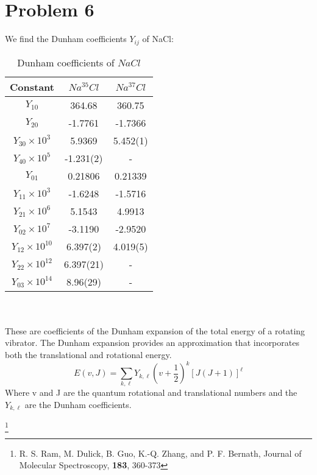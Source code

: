 \documentclass[a4paper,10pt]{article}
\numberwithin{equation}{section}
\begin{document}
\section{Problem 6}
We find the Dunham coefficients $Y_{ij}$ of NaCl\footnotemark[1]: \\
\begin{table}[h]
 \caption{Dunham coefficients of $NaCl$}
 \centering
 \begin{tabular}{ccc}
 \\
 Constant & $Na^{35}Cl$ & $Na^{37}Cl$ \\
 \hline
 $Y_{10}$ & 364.68 & 360.75 \\
 $Y_{20}$ & -1.7761 & -1.7366 \\
 $Y_{30}\times10^3$ & 5.9369 & 5.452(1) \\
 $Y_{40}\times10^5$ & -1.231(2) & - \\
 $Y_{01}$ & 0.21806 & 0.21339 \\
 $Y_{11}\times10^3$ & -1.6248 & -1.5716 \\
 $Y_{21}\times10^6$ & 5.1543 & 4.9913 \\
 $Y_{02}\times10^7$ & -3.1190 & -2.9520 \\ 
 $Y_{12}\times10^10$ & 6.397(2) & 4.019(5) \\
 $Y_{22}\times10^12$ & 6.397(21) & - \\
 $Y_{03}\times10^14$ & 8.96(29) & - \\
 \end{tabular} 
\end{table}
\\ \\
These are coefficients of the Dunham expansion of the total energy of a rotating vibrator.
The Dunham expansion provides an approximation that incorporates both the translational and rotational energy.
\begin{equation}
 E(v,J)=\sum_{k,\ell}Y_{k,\ell}(v+\frac{1}{2})^{k}[J(J+1)]^{\ell}
\end{equation}
Where v and J are the quantum rotational and translational numbers and the $Y_{k,\ell}$ are the Dunham coefficients.

\footnote[1]{R. S. Ram, M. Dulick, B. Guo, K.-Q. Zhang, and P. F. Bernath, 
Journal of Molecular Spectroscopy, \textbf{183}, 360-373  }
\end{document}
